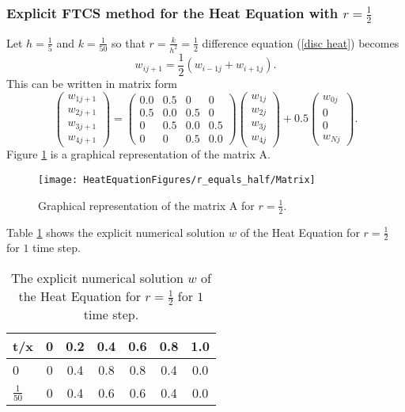 \begin{example}
\subsubsection{Explicit FTCS method for the Heat Equation with $r=\frac{1}{2}$}
Let $h=\frac{1}{5}$ and $k=\frac{1}{50}$ so that $r=\frac{k}{h^2}=\frac{1}{2}$
difference equation (\ref{disc heat}) becomes
\[
w_{ij+1}=\frac{1}{2}(w_{i-1j}+w_{i+1j}).
\]
This can be written in matrix form 
\[
\left(\begin{array}{c}
w_{1j+1}\\
w_{2j+1}\\
w_{3j+1}\\
w_{4j+1}
\end{array}\right)
=
\left(\begin{array}{cccc}
0.0&0.5&0&0\\
0.5&0.0&0.5&0\\
0&0.5&0.0&0.5\\
0&0&0.5&0.0
\end{array}\right)
\left(\begin{array}{c}
w_{1j}\\
w_{2j}\\
w_{3j}\\
w_{4j}
\end{array}\right)
+0.5\left(\begin{array}{c}
w_{0j}\\
0\\
0\\
w_{Nj}
\end{array}\right).
\]
Figure \ref{Matrix_FTCS_1_2} is a graphical representation of the matrix A. 
\begin{figure}[H]
  \caption{Graphical representation of the matrix A for $r=\frac{1}{2}$. }
  \centering
    \texttt{[image: HeatEquationFigures/r\_equals\_half/Matrix]}
    \label{Matrix_FTCS_1_2}
\end{figure}

Table \ref{Matrix_FTCS_1_2} shows the explicit numerical solution $w$ of the Heat Equation for $r=\frac{1}{2}$ for $1$ time step.


\begin{center}
\begin{table}[H]
 \caption{The explicit numerical solution $w$ of the Heat Equation for $r=\frac{1}{2}$ for $1$ time step.}
     \label{Table_FTCS_1_2}
 \centering
\begin{tabular}{l|cccccc}
t/x&0&0.2&0.4&0.6&0.8&1.0\\ \hline
0&0&0.4&0.8&0.8&0.4&0.0\\
$\frac{1}{50}$&0&0.4&0.6&0.6&0.4&0.0\\
\end{tabular}
\end{table}
\end{center}


\end{example}
